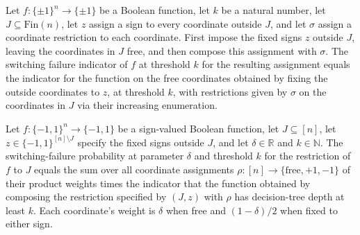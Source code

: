 \begin{theorem}
\label{FABL.coordSwitchingFailureIndicator_compose_coordRestrictionOf}
\leanok
{}
Let $f:\{\pm1\}^n\to\{\pm1\}$ be a Boolean function, let $k$ be a natural number, let
$J\subseteq\text{Fin}(n)$, let $z$ assign a sign to every coordinate outside $J$, and
let $\sigma$ assign a coordinate restriction to each coordinate. First impose the fixed
signs $z$ outside $J$, leaving the coordinates in $J$ free, and then compose this
assignment with $\sigma$. The switching failure indicator of $f$ at threshold $k$ for
the resulting assignment equals the indicator for the function on the free coordinates
obtained by fixing the outside coordinates to $z$, at threshold $k$, with restrictions
given by $\sigma$ on the coordinates in $J$ via their increasing enumeration.
\end{theorem}

\begin{theorem}
\label{FABL.switchingFailureProbability_reindexedSignRestriction}
\leanok
{}
Let $f:\{-1,1\}^n\to\{-1,1\}$ be a sign-valued Boolean function, let
$J\subseteq[n]$, let $z\in\{-1,1\}^{[n]\setminus J}$ specify the fixed signs
outside $J$, and let $\delta\in\mathbb R$ and $k\in\mathbb N$. The
switching-failure probability at parameter $\delta$ and threshold $k$ for the
restriction of $f$ to $J$ equals the sum over all coordinate assignments
$\rho:[n]\to\{\text{free},+1,-1\}$ of their product weights times the indicator
that the function obtained by composing the restriction specified by $(J,z)$ with
$\rho$ has decision-tree depth at least $k$. Each coordinate's weight is $\delta$ when
free and $(1-\delta)/2$ when fixed to either sign.
\end{theorem}

